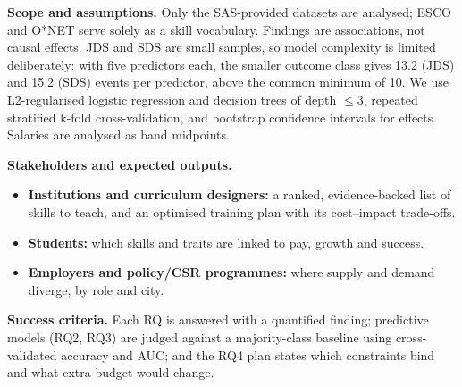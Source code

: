 \documentclass[12pt,a4paper]{article}
\begin{document}
\vspace{6pt}
\noindent\textbf{Scope and assumptions.}
Only the SAS-provided datasets are analysed; ESCO and O*NET serve solely as a skill vocabulary.
Findings are associations, not causal effects. JDS and SDS are small samples, so model
complexity is limited deliberately: with five predictors each, the smaller outcome class gives
13.2 (JDS) and 15.2 (SDS) events per predictor, above the common minimum of 10. We use
L2-regularised logistic regression and decision trees of depth $\le 3$, repeated stratified
k-fold cross-validation, and bootstrap confidence intervals for effects. Salaries are analysed
as band midpoints.

\vspace{4pt}
\noindent\textbf{Stakeholders and expected outputs.}
\begin{itemize}
  \item \textbf{Institutions and curriculum designers:} a ranked, evidence-backed list of skills
        to teach, and an optimised training plan with its cost--impact trade-offs.
  \item \textbf{Students:} which skills and traits are linked to pay, growth and success.
  \item \textbf{Employers and policy/CSR programmes:} where supply and demand diverge, by role and city.
\end{itemize}

\vspace{4pt}
\noindent\textbf{Success criteria.}
Each RQ is answered with a quantified finding; predictive models (RQ2, RQ3) are judged against
a majority-class baseline using cross-validated accuracy and AUC; and the RQ4 plan states which
constraints bind and what extra budget would change.
\end{document}
